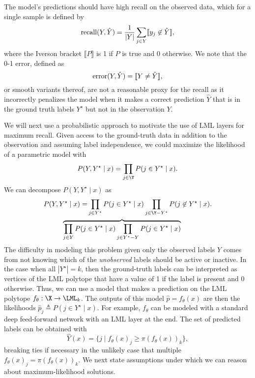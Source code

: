 The model's predictions should have high recall
on the observed data, which for a single sample
is defined by
\begin{equation*}
{\rm recall}(Y, \hat Y) =
  \frac{1}{|Y|} \sum_{j\in Y} \llbracket y_j\not\in \hat Y \rrbracket,
\end{equation*}
where the Iverson bracket $\llbracket P \rrbracket$
is 1 if $P$ is true and 0 otherwise.
We note that the 0-1 error, defined as
\begin{equation*}
  {\rm error}(Y, \hat Y) = \llbracket Y \neq \hat Y \rrbracket,
\end{equation*}
or smooth variants thereof, are not a reasonable proxy for
the recall as it incorrectly penalizes the model when
it makes a correct prediction $\hat Y$ that is in the ground
truth labels $Y^\star$ but not in the observation $Y$.

We will next use a probabilistic approach to motivate the
use of LML layers for maximum recall.
Given access to the ground-truth data in addition
to the observation and assuming label independence,
we could maximize
the likelihood of a parametric model with
\begin{equation}
  P(Y, Y^\star\mid x) = \prod_{j\in \Y} P(j\in Y^\star\mid x).
  \label{eq:ml-likelihood}
\end{equation}
We can decompose $P(Y, Y^\star\mid x)$ as
\begin{equation*}
  \begin{split}
  P(Y, Y^\star\mid x) = &\prod_{j\in Y^\star} P(j\in Y^\star\mid x)
    \prod_{j\in \Y-Y^\star} P(j\not\in Y^\star\mid x). \\
    &\hspace{-13mm}\overbrace{
      \prod_{j\in Y} P(j\in Y^\star\mid x)
      \prod_{j\in Y^\star-Y} P(j\in Y^\star\mid x)}
  \end{split}
\end{equation*}
The difficulty in modeling this problem given
only the observed labels $Y$ comes from not knowing which
of the \emph{unobserved} labels should be
active or inactive.
In the case when all $|Y^\star|=k$, then the ground-truth
labels can be interpreted as vertices of the
LML polytope that have a value of 1 if the label
is present and 0 otherwise.
Thus, we can use a model that makes a prediction
on the LML polytope $f_\theta:\X\rightarrow\LML_k$.
The outputs of this model $\hat p = f_\theta(x)$
are then the likelihoods $\hat p_j \triangleq P(j\in Y^\star \mid x)$.
For example, $f_\theta$ can be modeled with a standard
deep feed-forward network with an LML layer at the end.
The set of predicted labels can be obtained with
$$\hat Y(x) = \{j \mid f_{\theta}(x)_j \geq
\pi\left(f_{\theta}(x)\right)_k\},$$
breaking ties if necessary in the unlikely case
that multiple
$f_{\theta}(x)_j = \pi\left(f_{\theta}(x)\right)_k$.
We next state assumptions under which we can
reason about maximum-likelihood solutions.

